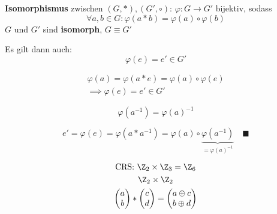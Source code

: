 \begin{def*}[note = Isomorphismus , index = Isomorphismus]
	\textbf{Isomorphismus} zwischen $( G , * ) , ( G' , \circ )$:
	$\varphi : G \rightarrow G'$ bijektiv, sodass
	\[ \forall a, b \in G : \varphi( a * b ) = \varphi( a ) \circ \varphi( b ) \]
	$G$ und $G'$ sind \textbf{isomorph}, $G \equiv G'$
\end{def*}
Es gilt dann auch:
\[ \varphi( e ) = e' \in G' \]
\begin{bew}
	\begin{gather*}
		\varphi(a) = \varphi(a * e) = \varphi(a) \circ \varphi(e) \\
		\implies \varphi(e) = e' \in G'
	\end{gather*}
\end{bew}
\[ \varphi(a^{-1}) = \varphi(a)^{-1} \]
\begin{bew}
	\[ e' = \varphi(e) = \varphi(a * a^{-1}) = \varphi(a) \circ \underbrace{\varphi(a^{-1})}_{=\varphi(a)^{-1}} \quad \blacksquare \]
\end{bew}
\begin{gather*}
	\text{CRS: } \Z_2 \times \Z_3 = \Z_6 \\
	\Z_2 \times \Z_2 \\
	\begin{pmatrix}a\\b\end{pmatrix} * \begin{pmatrix}c\\d\end{pmatrix} = \begin{pmatrix}a \oplus c\\b \oplus d\end{pmatrix}
\end{gather*}
